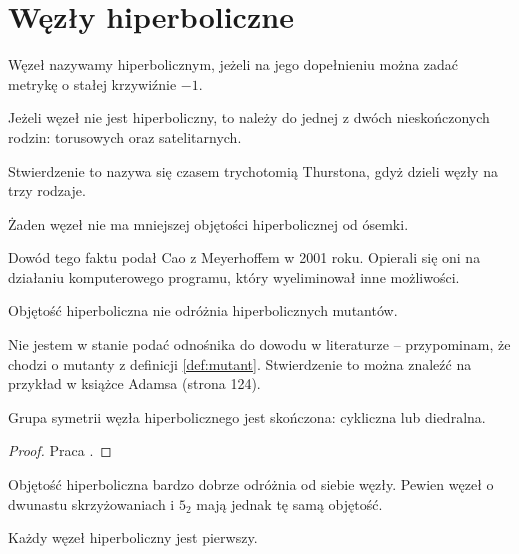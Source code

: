 \section{Węzły hiperboliczne} %
\label{sec:hyperbolic}
\begin{definition}
    Węzeł nazywamy hiperbolicznym, jeżeli na jego dopełnieniu można zadać metrykę o stałej krzywiźnie $-1$. 
\end{definition}

\begin{theorem}[Thurston, 1978]
    Jeżeli węzeł nie jest hiperboliczny, to należy do jednej z dwóch nieskończonych rodzin: torusowych oraz satelitarnych.
\end{theorem}

Stwierdzenie to nazywa się czasem trychotomią Thurstona, gdyż dzieli węzły na trzy rodzaje.

\begin{proposition}
    Żaden węzeł nie ma mniejszej objętości hiperbolicznej od ósemki.
\end{proposition}

Dowód tego faktu podał Cao z Meyerhoffem w 2001 roku.
Opierali się oni na działaniu komputerowego programu, który wyeliminował inne możliwości.

\begin{proposition}
    Objętość hiperboliczna nie odróżnia hiperbolicznych mutantów.
\end{proposition}

Nie jestem w stanie podać odnośnika do dowodu w literaturze -- przypominam, że chodzi o mutanty z definicji \ref{def:mutant}.
Stwierdzenie to można znaleźć na przykład w książce Adamsa (strona 124).

\begin{proposition}
    Grupa symetrii węzła hiperbolicznego jest skończona: cykliczna lub diedralna.
\end{proposition}

\begin{proof}
    Praca \cite{kodama92}.
\end{proof}

Objętość hiperboliczna bardzo dobrze odróżnia od siebie węzły.
Pewien węzeł o dwunastu skrzyżowaniach i $5_2$ mają jednak tę samą objętość.

\begin{proposition}
    Każdy węzeł hiperboliczny jest pierwszy. 
\end{proposition}

